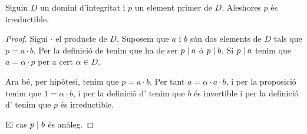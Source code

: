 \documentclass[../../Main.tex]{subfiles}
\begin{document}
	\begin{proposition}
		\label{prop:en un DI un primer és un irreductible}
		Siguin \(D\) un domini d'integritat i \(p\) un element primer de \(D\). Aleshores \(p\) és irreductible.
		\begin{proof}
			Sigui \(\cdot\) el producte de \(D\). Suposem que \(a\) i \(b\) són dos elements de \(D\) tals que \(p=a\cdot b\). Per la definició de  tenim que ha de ser \(p\mathrel{|} a\) ó \(p\mathrel{|} b\). Si \(p\mathrel{|} a\) tenim que \(a=\alpha\cdot p\) per a cert \(\alpha\in D\).
			
			Ara bé, per hipòtesi, tenim que \(p=a\cdot b\). Per tant \(a=\alpha\cdot a\cdot b\), i per la proposició  tenim que \(1=\alpha\cdot b\), i per la definició d' tenim que \(b\) és invertible i per la definició d' tenim que \(p\) és irreductible.
			
			El cas \(p\mathrel{|} b\) és anàleg.
		\end{proof}
	\end{proposition}
\end{document}
